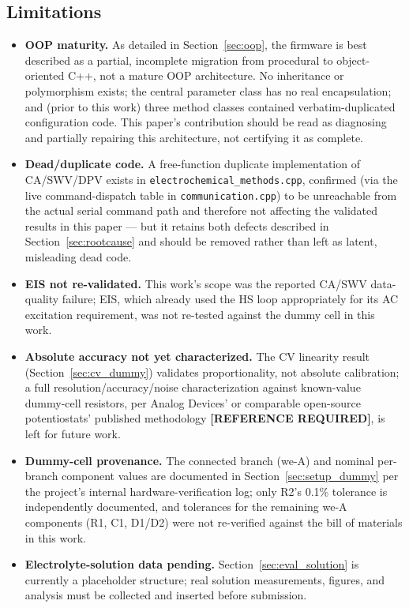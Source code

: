 \documentclass[preprint,12pt]{elsarticle}
\begin{document}
\subsection{Limitations}
\label{sec:limitations}
\begin{itemize}
\item \textbf{OOP maturity.} As detailed in Section~\ref{sec:oop}, the firmware is best described as a partial, incomplete migration from procedural to object-oriented C++, not a mature OOP architecture. No inheritance or polymorphism exists; the central parameter class has no real encapsulation; and (prior to this work) three method classes contained verbatim-duplicated configuration code. This paper's contribution should be read as diagnosing and partially repairing this architecture, not certifying it as complete.
\item \textbf{Dead/duplicate code.} A free-function duplicate implementation of CA/SWV/DPV exists in \texttt{electrochemical\_methods.cpp}, confirmed (via the live command-dispatch table in \texttt{communication.cpp}) to be unreachable from the actual serial command path and therefore not affecting the validated results in this paper --- but it retains both defects described in Section~\ref{sec:rootcause} and should be removed rather than left as latent, misleading dead code.
\item \textbf{EIS not re-validated.} This work's scope was the reported CA/SWV data-quality failure; EIS, which already used the HS loop appropriately for its AC excitation requirement, was not re-tested against the dummy cell in this work.
\item \textbf{Absolute accuracy not yet characterized.} The CV linearity result (Section~\ref{sec:cv_dummy}) validates proportionality, not absolute calibration; a full resolution/accuracy/noise characterization against known-value dummy-cell resistors, per Analog Devices' or comparable open-source potentiostats' published methodology \textbf{[REFERENCE REQUIRED]}, is left for future work.
\item \textbf{Dummy-cell provenance.} The connected branch (we-A) and nominal per-branch component values are documented in Section~\ref{sec:setup_dummy} per the project's internal hardware-verification log; only R2's 0.1\% tolerance is independently documented, and tolerances for the remaining we-A components (R1, C1, D1/D2) were not re-verified against the bill of materials in this work.
\item \textbf{Electrolyte-solution data pending.} Section~\ref{sec:eval_solution} is currently a placeholder structure; real solution measurements, figures, and analysis must be collected and inserted before submission.
\end{itemize}
\end{document}
